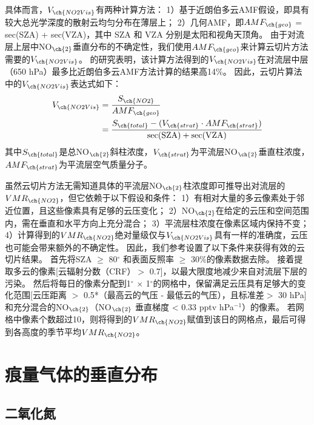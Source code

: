 具体而言，$V_{\ch{NO2Vis}}$有两种计算方法：
1）基于近朗伯多云AMF假设，即具有较大总光学深度的散射云均匀分布在薄层上\citep{Choi.2014}；
2）几何AMF，即$AMF_{\ch{geo}}$ = sec(SZA) + sec(VZA)，其中 SZA 和 VZA 分别是太阳和视角天顶角\citep{Marais.2018,Marais.2021}。
由于对流层上层中NO$_{\ch{2}}$垂直分布的不确定性\citep{Travis.2016}，我们使用$AMF_{\ch{geo}}$来计算云切片方法需要的$V_{\ch{NO2Vis}}$。
\citet{Choi.2014}的研究表明，该计算方法得到的$V_{\ch{NO2Vis}}$在对流层中层（650 hPa）最多比近朗伯多云AMF方法计算的结果高14\%。
因此，云切片算法中的$V_{\ch{NO2Vis}}$表达式如下：
\begin{equation} \label{eq:AMF_geo}
\begin{split}
V_{\ch{NO2Vis}} & = \frac{S_{\ch{NO2}}}{AMF_{\ch{geo}}} \\
             & = \frac{S_{\ch{total}}-(V_{\ch{strat}} \cdot AMF_{\ch{strat}})}{\sec (\mathrm{SZA})+\sec (\mathrm{VZA})}
\end{split}
\end{equation}
其中$S_{\ch{total}}$是总NO$_{\ch{2}}$斜柱浓度，$V_{\ch{strat}}$为平流层NO$_{\ch{2}}$垂直柱浓度，$AMF_{\ch{strat}}$为平流层空气质量分子。


虽然云切片方法无需知道具体的平流层NO$_{\ch{2}}$柱浓度即可推导出对流层的$VMR_{\ch{NO2}}$，但它依赖于以下假设和条件：
1）有相对大量的多云像素处于邻近位置，且这些像素具有足够的云压变化；
2）NO$_{\ch{2}}$在给定的云压和空间范围内，需在垂直和水平方向上充分混合；
3）平流层柱浓度在像素区域内保持不变；
4）计算得到的$VMR_{\ch{NO2}}$绝对量级仅与$V_{\ch{NO2Vis}}$具有一样的准确度，云压也可能会带来额外的不确定性。
因此，我们参考\citet{Marais.2021}设置了以下条件来获得有效的云切片结果。
首先将SZA $\geq$ 80$^{\circ}$ 和表面反照率 $\geq$  30\%的像素数据去除。
接着提取多云的像素[云辐射分数（CRF）$>$ 0.7]，以最大限度地减少来自对流层下层的污染。
然后将每日的像素分配到1$^{\circ}$ $\times$ 1$^{\circ}$的网格中，保留满足云压具有足够大的变化范围[云压距离 $>$ 0.5*（最高云的气压 - 最低云的气压），且标准差$>$ 30 hPa]和充分混合的NO$_{\ch{2}}$（NO$_{\ch{2}}$ 垂直梯度 < 0.33 pptv hPa$^{-1}$）的像素。
若网格中像素个数超过10，则将得到的$VMR_{\ch{NO2}}$赋值到该日的网格点，最后可得到各高度的季节平均$VMR_{\ch{NO2}}$。

\section{痕量气体的垂直分布}

\subsection{二氧化氮}  \label{sec:no2_profile}



